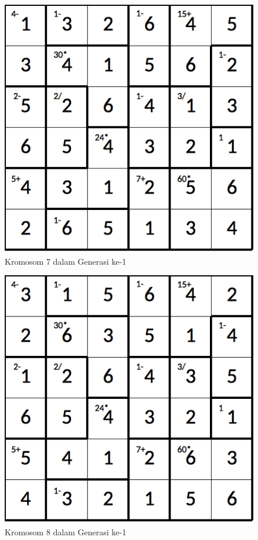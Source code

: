 \documentclass[a4paper,twoside]{article}
\begin{document}
\begin{enumerate}
\begin{figure}
\centering
\captionsetup{justification=centering}
\includegraphics[scale=0.333]{Gambar/hybridgenetic/Generation1Chromosome7}
\caption[Kromosom 7 dalam Generasi ke-1]{Kromosom 7 dalam Generasi ke-1}
\label{fig:analisisg1k7}
\end{figure}

\begin{figure}
\centering
\captionsetup{justification=centering}
\includegraphics[scale=0.333]{Gambar/hybridgenetic/Generation1Chromosome8}
\caption[Kromosom 8 dalam Generasi ke-1]{Kromosom 8 dalam Generasi ke-1}
\label{fig:analisisg1k8}
\end{figure}


\end{enumerate}
\end{document}
